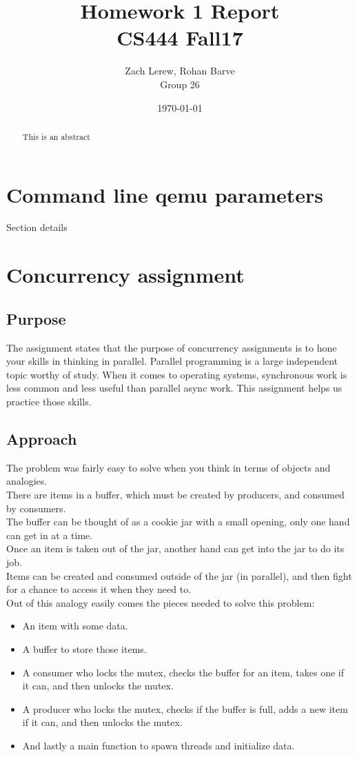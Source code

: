 \documentclass[letterpaper,10pt,fleqn]{article}
\title{Homework 1 Report\\\large CS444 Fall17}
\author{Zach Lerew, Rohan Barve\\\large Group 26}
\date{\today}
\begin{document}
	\begin{titlingpage}
		\maketitle
		\begin{abstract}
			This is an abstract
		\end{abstract}
	\end{titlingpage}


	\section*{Command line qemu parameters}
	Section details

	\section*{Concurrency assignment}
	\subsection*{Purpose}
	The assignment states that the purpose of concurrency assignments is to hone your skills in thinking in parallel.
	Parallel programming is a large independent topic worthy of study.
	When it comes to operating systems, synchronous work is less common and less useful than parallel async work.
	This assignment helps us practice those skills.
	\subsection*{Approach}
	The problem was fairly easy to solve when you think in terms of objects and analogies.
	\\There are items in a buffer, which must be created by producers, and consumed by consumers.
	\\The buffer can be thought of as a cookie jar with a small opening, only one hand can get in at a time.
	\\Once an item is taken out of the jar, another hand can get into the jar to do its job.
	\\Items can be created and consumed outside of the jar (in parallel), and then fight for a chance to access it when they need to.
	\\Out of this analogy easily comes the pieces needed to solve this problem:
	\begin{itemize}
		\item An item with some data.
		\item A buffer to store those items.
		\item A consumer who locks the mutex, checks the buffer for an item, takes one if it can, and then unlocks the mutex.
		\item A producer who locks the mutex, checks if the buffer is full, adds a new item if it can, and then unlocks the mutex.
		\item And lastly a main function to spawn threads and initialize data.
	\end{itemize}
\end{document}
